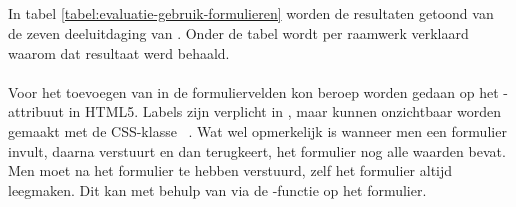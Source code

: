 
\subsection{}
\label{sec:evaluatie-gebruik-formulieren}

In tabel \ref{tabel:evaluatie-gebruik-formulieren} worden de resultaten getoond van de zeven deeluitdaging van .
Onder de tabel wordt per raamwerk verklaard waarom dat resultaat werd behaald.

\begin{table}[H]
\centering
{}
\caption{Gebruik voor }
\label{tabel:evaluatie-gebruik-formulieren}
\end{table}


\paragraph{\jqm} 
Voor het toevoegen van  in de formuliervelden kon beroep worden gedaan op het -attribuut in HTML5. 
Labels zijn verplicht in \jqm{}, maar kunnen onzichtbaar worden gemaakt met de CSS-klasse ~\cite{JQuery2013}. 
Wat wel opmerkelijk is wanneer men een formulier invult, daarna verstuurt en dan terugkeert, het formulier nog alle waarden bevat. 
Men moet na het formulier te hebben verstuurd, zelf het formulier altijd leegmaken. 
Dit kan met behulp van \js{} via de -functie op het formulier.
 
